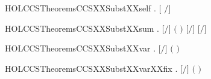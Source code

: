 \newcommand{\HOLCCSTheoremsCCSXXSubstXXrestr}{\UseVerbatim{HOLCCSTheoremsCCSXXSubstXXrestr}}
\begin{SaveVerbatim}{HOLCCSTheoremsCCSXXSubstXXself}
\HOLTokenTurnstile{} \HOLSymConst{\HOLTokenForall{}} . \ensuremath{[} \ensuremath{/}\ensuremath{]}  \HOLSymConst{\ensuremath{=}} 
\end{SaveVerbatim}
\newcommand{\HOLCCSTheoremsCCSXXSubstXXself}{\UseVerbatim{HOLCCSTheoremsCCSXXSubstXXself}}
\begin{SaveVerbatim}{HOLCCSTheoremsCCSXXSubstXXsum}
\HOLTokenTurnstile{} \HOLSymConst{\HOLTokenForall{}}   . \ensuremath{[}\ensuremath{/}\ensuremath{]} \ensuremath{(} \HOLSymConst{\ensuremath{+}} \ensuremath{)} \HOLSymConst{\ensuremath{=}} \ensuremath{[}\ensuremath{/}\ensuremath{]}  \HOLSymConst{\ensuremath{+}} \ensuremath{[}\ensuremath{/}\ensuremath{]} 
\end{SaveVerbatim}
\newcommand{\HOLCCSTheoremsCCSXXSubstXXsum}{\UseVerbatim{HOLCCSTheoremsCCSXXSubstXXsum}}
\begin{SaveVerbatim}{HOLCCSTheoremsCCSXXSubstXXvar}
\HOLTokenTurnstile{} \HOLSymConst{\HOLTokenForall{}}  . \ensuremath{[}\ensuremath{/}\ensuremath{]} \ensuremath{(} \ensuremath{)} \HOLSymConst{\ensuremath{=}}   \HOLSymConst{\ensuremath{=}}      
\end{SaveVerbatim}
\newcommand{\HOLCCSTheoremsCCSXXSubstXXvar}{\UseVerbatim{HOLCCSTheoremsCCSXXSubstXXvar}}
\begin{SaveVerbatim}{HOLCCSTheoremsCCSXXSubstXXvarXXfix}
\HOLTokenTurnstile{} \HOLSymConst{\HOLTokenForall{}} . \ensuremath{[}\ensuremath{/}\ensuremath{]} \ensuremath{(} \ensuremath{)} \HOLSymConst{\ensuremath{=}} 
\end{SaveVerbatim}
\newcommand{\HOLCCSTheoremsCCSXXSubstXXvarXXfix}{\UseVerbatim{HOLCCSTheoremsCCSXXSubstXXvarXXfix}}
